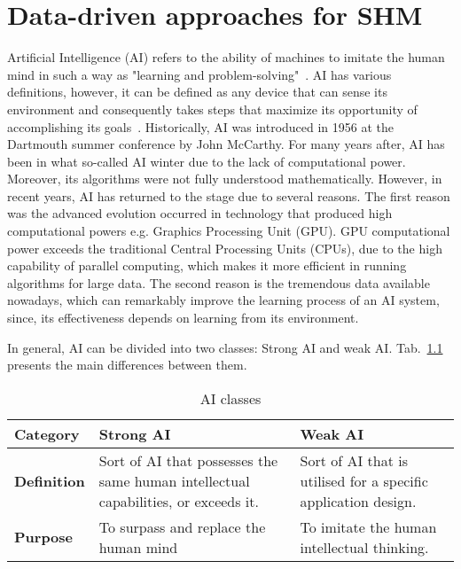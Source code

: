 \chapter[Data-driven for SHM]{Data-driven approaches for SHM}
\label{ch3}

Artificial Intelligence (AI) refers to the ability of machines to imitate the human mind in such a way as "learning and problem-solving"~\cite{Russell2010}.
AI has various definitions, however, it can be defined as any device that can sense its environment and consequently takes steps that maximize its opportunity of accomplishing its goals~\cite{Russell2010}.
Historically, AI was introduced in 1956 at the Dartmouth summer conference by John McCarthy.
For many years after, AI has been in what so-called AI winter due to the lack of  computational power.
Moreover, its algorithms were not fully understood mathematically.
However, in recent years, AI has returned to the stage due to several reasons. The first reason was the advanced evolution occurred in technology that produced high computational powers e.g. Graphics Processing Unit (GPU). 
GPU computational power exceeds the traditional Central Processing Units (CPUs), due to the high capability of parallel computing, which makes it more efficient in running algorithms for large data.
The second reason is the tremendous data available nowadays, which can remarkably improve the learning process of an AI system, since, its effectiveness depends on learning from its environment. 

In general, AI can be divided into two classes: Strong AI and weak AI. Tab.~\ref{tab:Strong_Weak_AI} presents the main differences between them.
\begin{table}[h]
	\renewcommand{\arraystretch}{1.1}
	\centering
	\caption{AI classes}
	\scriptsize
	\begin{tabular}{p{2cm}p{4cm}p{4cm}} 
		\toprule
		\textbf{Category} & \textbf{Strong AI} & \textbf{Weak AI} \\ \midrule
		\textbf{Definition} & Sort of AI that possesses the same human intellectual capabilities, or exceeds it. & Sort of AI that is utilised for a specific application design. \\ \midrule
		
		\textbf{Purpose} &To surpass and replace the human mind  &  To imitate the human intellectual thinking. \\  
		\bottomrule
	\end{tabular}
	\label{tab:Strong_Weak_AI}
\end{table}
